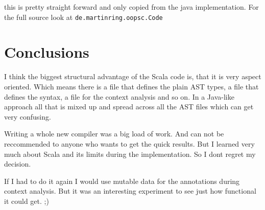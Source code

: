 \documentclass{style}
\begin{document}
this is pretty straight forward and only copied from the java implementation. For the full source look at \texttt{de.martinring.oopsc.Code}

\section{Conclusions}

I think the biggest structural advantage of the Scala code is, that it is very aspect oriented. Which means there is a file that defines the plain AST types, a file that defines the syntax, a file for the context analysis and so on. In a Java-like approach all that is mixed up and spread across all the AST files which can get very confusing.

Writing a whole new compiler was a big load of work. And can not be reccommended to anyone who wants to get the quick results. But I learned very much about Scala and its limits during the implementation. So I dont regret my decision.

If I had to do it again I would use mutable data for the annotations during context analysis. But it was an interesting experiment to see just how functional it could get. ;) 
\end{document}
